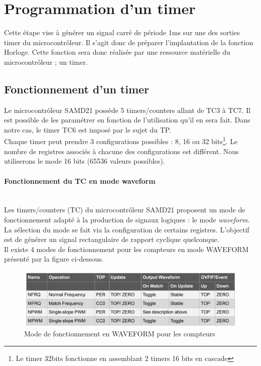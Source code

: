 \documentclass[a4paper]{article}
\begin{document}
\newpage
\section{Programmation d'un timer}
Cette étape vise à générer un signal carré de période 1ms sur une des sorties timer du microcontrôleur. Il s'agit donc de préparer l'implantation de la fonction Horloge. Cette fonction sera donc réalisée par une ressource matérielle du microcontrôleur ; un timer.
\subsection{Fonctionnement d'un timer}
Le microcontrôleur SAMD21 possède 5 timers/counters allant de TC3 à TC7. Il est possible de les paramétrer en fonction de l’utilisation qu’il en sera fait. Dans notre cas, le timer TC6 est imposé par le sujet du TP.\\
Chaque timer peut prendre 3 configurations possibles : 8, 16 ou 32 bits\footnote{Le timer 32bits fonctionne en assemblant 2 timers 16 bits en cascade}. Le nombre de registres associés à chacune des configurations est différent. Nous utiliserons le mode 16 bits (65536 valeurs possibles).  \\
\paragraph{Fonctionnement du TC en mode waveform}
~~\\
Les timers/counters (TC) du microcontrôleur SAMD21 proposent un mode de fonctionnement adapté à la production de signaux logiques : le mode {\sl waveform}. La sélection du mode se fait via la configuration de certains registres. L'objectif est de générer un signal rectangulaire de rapport cyclique quelconque. \\
Il existe 4 modes de fonctionnement pour les compteurs en mode WAVEFORM présenté par la figure ci-dessous. \\

\begin{figure}[H]
\centering
\includegraphics[width=12cm]{figure/mode Waveform.jpg}
\caption{Mode de fonctionnement en WAVEFORM pour les compteurs}
\label{pic1}
\end{figure}
\end{document}
